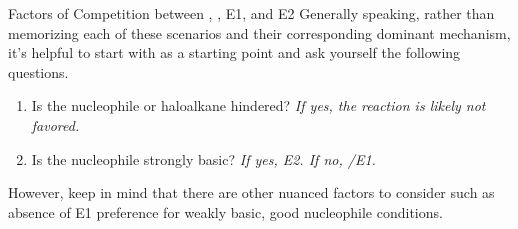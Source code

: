 \documentclass[10pt]{article}
\begin{document}
\begin{core}{Factors of Competition between \snt, \sno, E1, and E2}
    Generally speaking, rather than memorizing each of these scenarios and their corresponding dominant mechanism, it's helpful to start with \snt as a starting point and ask yourself the following questions.

    \begin{enumerate}


\item Is the nucleophile or haloalkane hindered? \textit{If yes, the \snt reaction is likely not favored.}

\item Is the nucleophile strongly basic? \textit{If yes, E2. If no, \sno/E1.}

    
\end{enumerate}

    However, keep in mind that there are other nuanced factors to consider such as absence of E1 preference for weakly basic, good nucleophile conditions.

  \end{core}
  
\end{document}
